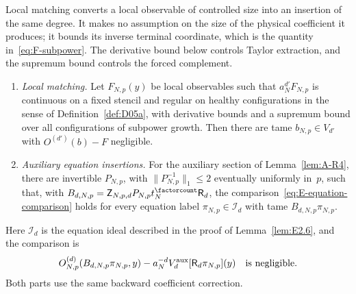 Local matching converts a local observable of controlled size into an insertion of the same degree. It makes no assumption on the size of the physical coefficient it produces; it bounds its inverse terminal coordinate, which is the quantity in~\eqref{eq:F-subpower}. The derivative bound below controls Taylor extraction, and the supremum bound controls the forced complement.
\begin{lemma}\label{lem:E-local-comparison}
\begin{enumerate}
\item[(i)] \emph{Local matching.} Let $F_{N,p}(y)$ be local observables such that $a_N^{d'}F_{N,p}$ is continuous on a fixed stencil and regular on healthy configurations in the sense of Definition~\ref{def:D05a}, with derivative bounds and a supremum bound over all configurations of subpower growth. Then there are tame $b_{N,p}\in V_{d'}$ with $O^{(d')}(b)-F$ negligible.
\item[(ii)] \emph{Auxiliary equation insertions.} For the auxiliary section of Lemma~\ref{lem:A-R4}, there are invertible $P_{N,p}$, with $\|P_{N,p}^{-1}\|_1\le2$ eventually uniformly in~$p$, such that, with $B_{d,N,p}=\mathsf Z_{N,p,d}P_{N,p}t_N^{\factorcount}\mathsf R_d$, the comparison~\eqref{eq:E-equation-comparison} holds for every equation label $\pi_{N,p}\in\mathcal I_d$ with tame $B_{d,N,p}\pi_{N,p}$.
\end{enumerate}
\end{lemma}
Here $\mathcal I_d$ is the equation ideal described in the proof of Lemma~\ref{lem:E2.6}, and the comparison is
\begin{equation}\label{eq:E-equation-comparison}
 O^{(d)}_{N,p}(B_{d,N,p}\pi_{N,p},y)
 -a_N^{-d}V_d^{\rm aux}[\mathsf R_d\pi_{N,p}](y)
 \quad\text{is negligible}.
\end{equation}
Both parts use the same backward coefficient correction.
